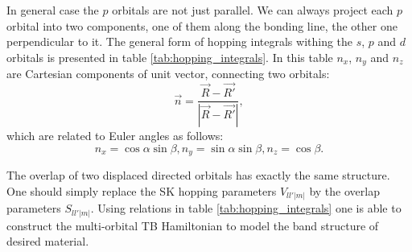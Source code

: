 In general case the $p$ orbitals are not just parallel. We can always project each $p$ orbital into two components, one of them along the bonding line, the other one perpendicular to it. The general form of hopping integrals withing the $s$, $p$ and $d$ orbitals is presented in table \ref{tab:hopping_integrals}. In this table $n_x$, $n_y$ and $n_z$ are Cartesian components of unit vector, connecting two orbitals:
\begin{equation}
	\vec{n} = \frac{\vec{R} - \vec{R'}}{|\vec{R} - \vec{R'}|},
\end{equation}
which are related to Euler angles as follows:
\begin{equation}
	n_x =\cos{\alpha} \sin{\beta}, n_y = \sin{\alpha} \sin{\beta}, n_z = \cos{\beta}. 
\end{equation}

The overlap of two displaced directed orbitals has exactly the same structure. One should simply replace the SK hopping parameters $V_{l l' |m|}$ by the overlap parameters $S_{l l' |m|}$. Using relations in table \ref{tab:hopping_integrals} one is able to construct the multi-orbital TB Hamiltonian to model the band structure of desired material.

